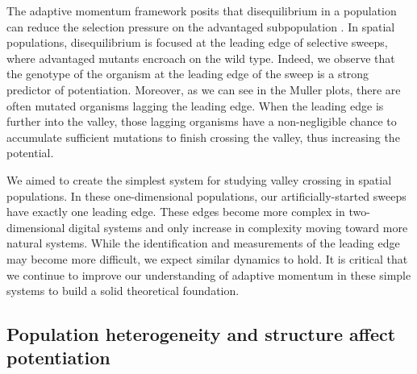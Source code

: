 The adaptive momentum framework posits that disequilibrium in a population can reduce the selection pressure on the advantaged subpopulation \citep{Bohm2024.04.08.588357}.
In spatial populations, disequilibrium is focused at the leading edge of selective sweeps, where advantaged mutants encroach on the wild type. %
Indeed, we observe that the genotype of the organism at the leading edge of the sweep is a strong predictor of potentiation. 
Moreover, as we can see in the Muller plots, there are often mutated organisms lagging the leading edge. 
When the leading edge is further into the valley, those lagging organisms have a non-negligible chance to accumulate sufficient mutations to finish crossing the valley, thus increasing the potential.

We aimed to create the simplest system for studying valley crossing in spatial populations.
In these one-dimensional populations, our artificially-started sweeps have exactly one leading edge. %
These edges become more complex in two-dimensional digital systems and only increase in complexity moving toward more natural systems. 
While the identification and measurements of the leading edge may become more difficult, we expect similar dynamics to hold. 
It is critical that we continue to improve our understanding of adaptive momentum in these simple systems to build a solid theoretical foundation. 


\subsection{Population heterogeneity and structure affect potentiation}

